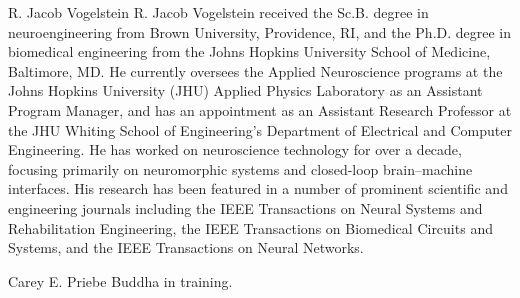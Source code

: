 \documentclass[10pt,journal,cspaper,compsoc]{IEEEtran}
\begin{document}

\begin{IEEEbiographynophoto}{R. Jacob Vogelstein}
R. Jacob Vogelstein received the Sc.B. degree in neuroengineering from Brown University, Providence, RI, and the Ph.D. degree in biomedical engineering from the Johns Hopkins University School of Medicine, Baltimore, MD.  He currently oversees the Applied Neuroscience programs at the Johns Hopkins University (JHU) Applied Physics Laboratory as an Assistant Program Manager, and has an appointment as an Assistant Research Professor at the JHU Whiting School of Engineering’s Department of Electrical and Computer Engineering. He has worked on neuroscience technology for over a decade, focusing primarily on neuromorphic systems and closed-loop brain–machine interfaces. His research has been featured in a number of prominent scientific and engineering journals including the IEEE Transactions on Neural Systems and Rehabilitation Engineering, the IEEE Transactions on Biomedical Circuits and Systems, and the IEEE Transactions on Neural Networks.  
\end{IEEEbiographynophoto}

\begin{IEEEbiography}{Carey E. Priebe}
Buddha in training.
\end{IEEEbiography}

\end{document}
